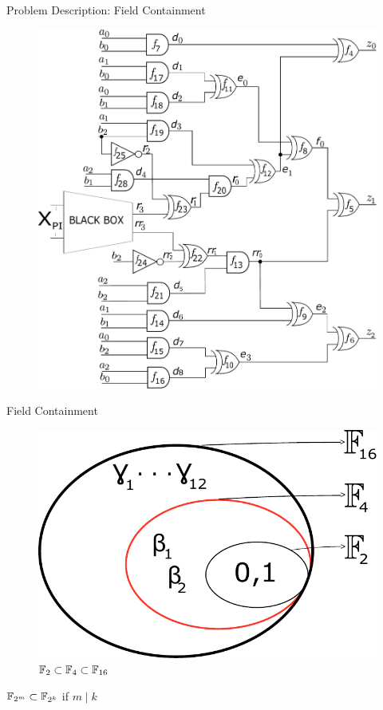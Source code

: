 \begin{frame}{\large Problem Description: Field Containment}
\begin{figure}[hbt]
\centering
\includegraphics[scale=0.26]{mas_3_ddc_mfr_b_bb.pdf}
\caption*{
}
\end{figure}
\end{frame}

\begin{frame}{\large Field Containment}
\begin{figure}[hbt]
\centering
    \includegraphics[scale = 0.45]{field_containment.pdf}
    \vspace{0.1in}
    \caption*{\large ${\mathbb{F}}_2 \subset {\mathbb{F}}_{4} \subset {\mathbb{F}}_{16}$}
    \label{fig:field_cont}
\end{figure}
\bi
	\pause
	\item ${\mathbb{F}}_{2^m} \subset {\mathbb{F}}_{2^k}$ if $m \mid k$
\ei
\end{frame}


